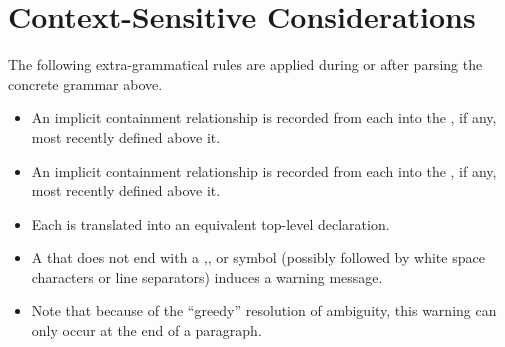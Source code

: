 \documentclass{article}
\begin{document}
\vfill\eject

\section{Context-Sensitive Considerations}

The following extra-grammatical rules are applied during or after parsing the concrete grammar above.

\begin{itemize}
\item 
  An implicit containment relationship is recorded from each  into the
  , if any, most recently defined above it.
\item
  An implicit containment relationship is recorded from each  into the
  , if any, most recently defined above it.
\item 
  Each  is translated into an equivalent top-level  declaration.
\item
  A  that does not end with a ,\gtkc{!}, or  symbol
(possibly followed by white space characters or line separators) induces a warning message.
\item
  Note that because of the ``greedy'' resolution of ambiguity, this warning can only occur at the end of a paragraph.
\end{itemize}
\end{document}

